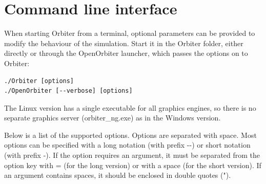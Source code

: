 \documentclass[Orbiter User Manual.tex]{subfiles}
\begin{document}
\section{Command line interface}
When starting Orbiter from a terminal, optional parameters can be provided to modify the behaviour of the simulation. Start it in the Orbiter folder, either directly or through the OpenOrbiter launcher, which passes the options on to Orbiter:

\begin{lstlisting}[language=OSFS]
./Orbiter [options]
./OpenOrbiter [--verbose] [options]
\end{lstlisting}

\noindent
The Linux version has a single executable for all graphics engines, so there is no separate graphics server (orbiter\_ng.exe) as in the Windows version.

\noindent
Below is a list of the supported options. Options are separated with space. Most options can be specified with a long notation (with prefix -{}-) or short notation (with prefix -). If the option requires an argument, it must be separated from the option key with = (for the long version) or with a space (for the short version). If an argument contains spaces, it should be enclosed in double quotes (").
\end{document}
